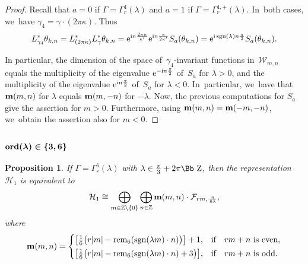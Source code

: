 \documentclass[10pt,a4paper]{amsart}
\newcommand\ZZ{{\mbox{\Bb Z}}}
\newcommand\Z{{\mathbb Z}}
\newcommand\bm{\textbf{{\rm \textbf{m}}}}
\newcommand\cH{{\mathcal H}}
\newcommand\cF{{\mathcal F}}
\newcommand{\sgn}{\mathop{{\rm sgn}}}
\newcommand{\rem}{\mathop{{\rm rem}}}
\newcommand{\ord}{{\rm ord}}
\numberwithin{equation}{section}
\newtheorem{Proposition}[Theorem]{Proposition}
 { \theoremstyle{definition}
\newtheorem{Definition}[Theorem]{Definition}
\newtheorem{Note}[Theorem]{Note}
\newtheorem{Example}[Theorem]{Example}
\newtheorem{Remark}[Theorem]{Remark} }
\begin{document}
\begin{proof}
Recall that $a=0$ if $\Gamma=\Gamma_r^4(\lambda)$ and $a=1$ if $\Gamma=\Gamma_r^{4,+}(\lambda)$. In~both cases, we~have $\gamma_4=\gamma\cdot(2\pi\kappa)$. Thus
\begin{gather*}
L^*_{\gamma_4} \theta_{k,n}=L^*_{(2\pi\kappa)} L^*_{\gamma}\theta_{k,n}={\rm e}^{{\rm i}n\frac{2\pi\kappa}{\kappa'}}{\rm e}^{{\rm i}n\frac{\pi}{2\kappa'}}S_a(\theta_{k,n})={\rm e}^{{\rm i}\sgn(\lambda)n\frac{\pi}{2}}S_a(\theta_{k,n}).
\end{gather*}

In particular, the dimension of the space of~$\gamma_4$-invariant functions in~${\mathcal W}_{m,n}$ equals the multiplicity of the eigenvalue ${\rm e}^{-{\rm i}n\frac{\pi}{2}}$ of~$S_a$ for $\lambda>0$, and the multiplicity of the eigenvalue ${\rm e}^{{\rm i}n\frac{\pi}{2}}$ of~$S_a$ for $\lambda<0$. In~particular, we~have that $\bm(m,n)$ for $\lambda$ equals $\bm(m,-n)$ for $-\lambda$. Now, the previous computations for $S_a$ give the assertion for $m>0$. Furthermore, using $\textbf{m}(m,n)=\bm(-m,-n)$, we~obtain the assertion also for $m<0$.
\end{proof}

\subsubsection[$\ord(\lambda)\in\{3,6\}$]{$\boldsymbol{\ord(\lambda)\in\{3,6\}}$}

\begin{Proposition} \label{P13} If $\Gamma=\Gamma^6_r(\lambda)$ with $\lambda\in\frac{\pi}3+2\pi\ZZ$, then the representation~$\cH_1$ is equivalent to
\begin{gather*}
\cH_1\cong\bigoplus_{m\in \Z\backslash\{0\}} \bigoplus_{n\in\Z} \bm(m,n)\cdot \cF_{rm,\,\frac n{6\lambda}},
\end{gather*}
where
\begin{gather*}
\bm(m,n) =\begin{cases}
\big[\frac16\big({r|m|-\rem_6(\sgn(\lambda m)\cdot n)}\big)\big]+1,& \text{if\quad $rm+n$ is even},
\\[.5ex]
\big[\frac16\big(r|m|-\rem_6(\sgn(\lambda m)\cdot n)+3\big)\big],& \text{if\quad $rm+n$ is odd}.
\end{cases}
\end{gather*}
\end{Proposition}
\end{document}
